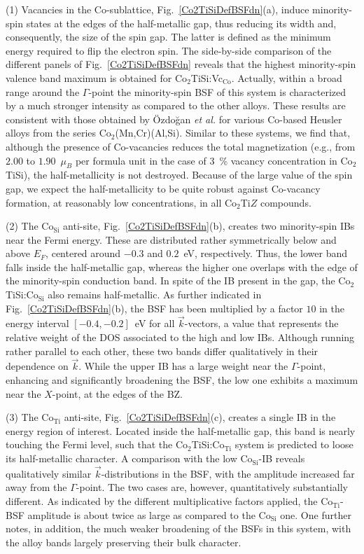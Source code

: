 \documentclass[aps,prb,twocolumn,superscriptaddress,showpacs]{revtex4}
\newcommand{\FG}[1]{Fig.~\ref{#1}}
\newcommand{\ea}{{\it et al.}}
\begin{document}
(1) Vacancies in the Co-sublattice, \FG{Co2TiSiDefBSFdn}(a),
induce minority-spin 
states at the edges of the half-metallic gap,
thus reducing its width and,
consequently, the size of the spin gap. The
latter is defined as the minimum energy 
required to flip the electron spin. The
side-by-side comparison of the different panels of 
\FG{Co2TiSiDefBSFdn} reveals that
the highest minority-spin valence band maximum
is obtained for Co$_2$TiSi:Vc$_\text{Co}$. Actually,
within a broad range around the $\Gamma$-point
the minority-spin BSF of this system is characterized
by a much stronger intensity as compared to the other 
alloys. These results are consistent with those obtained by 
\"{O}zdo\u{g}an \ea\cite{OSG07} for various Co-based
Heusler alloys from the series  Co$_2$(Mn,Cr)(Al,Si).
Similar to these systems, we find that,
although the presence of Co-vacancies reduces the 
total magnetization (e.g., from $2.00$ to $1.90$~$\mu_B$ 
per formula unit in 
the case of $3$~\% vacancy concentration in Co$_2$TiSi), the
half-metallicity is not destroyed. Because of the 
large value of the spin gap, we expect the half-metallicity to
be quite robust against Co-vacancy formation,
at reasonably low concentrations, in all Co$_2$Ti$Z$ compounds.

(2) The Co$_\text{Si}$ anti-site, \FG{Co2TiSiDefBSFdn}(b),
creates two minority-spin IBs near the Fermi energy. 
These are distributed rather symmetrically below and above 
$E_F$, centered around $-0.3$ and $0.2$~eV, respectively. 
Thus, the lower band falls inside the half-metallic
gap, whereas the higher one overlaps with the 
edge of the minority-spin conduction band. In spite 
of the IB present in the gap, the Co$_2$TiSi:Co$_\text{Si}$ also
remains half-metallic. 
As further indicated in \FG{Co2TiSiDefBSFdn}(b), 
the BSF has been multiplied by a factor $10$ in the
energy interval $[-0.4,-0.2]$~eV for all $\vec k$-vectors, a value
that represents the relative weight of the DOS associated to
the high and low IBs. 
Although running rather parallel to each other, these two 
bands differ qualitatively in their dependence on $\vec k$. 
While the upper IB has a large weight
near the $\Gamma$-point, enhancing and significantly broadening 
the BSF, the low one exhibits a maximum near the $X$-point,
at the edges of the BZ. 

(3) The Co$_\text{Ti}$ anti-site, \FG{Co2TiSiDefBSFdn}(c), 
creates a single IB in the energy region of interest.
Located inside the half-metallic gap, this band is
nearly touching the Fermi level, such that
the Co$_2$TiSi:Co$_\text{Ti}$ system is predicted to loose
its half-metallic character.
A comparison with the low Co$_\text{Si}$-IB 
reveals qualitatively similar $\vec k$-distributions in the BSF, 
with the amplitude increased far away from the $\Gamma$-point. 
The two cases are, however, quantitatively substantially different.
As indicated by the different multiplicative factors applied,
the Co$_\text{Ti}$-BSF amplitude is about twice as large
as compared to the Co$_\text{Si}$ one. 
One further notes, in addition, the much weaker broadening
of the BSFs in this system, with the alloy bands largely
preserving their bulk character. 
\end{document}
